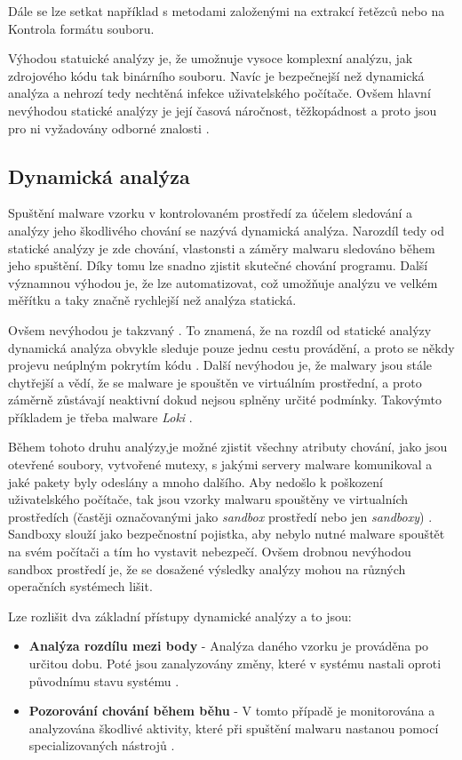 Dále se lze setkat například s metodami založenými na extrakcí řetězců nebo na Kontrola formátu souboru.

Výhodou statuické analýzy je, že umožnuje vysoce komplexní analýzu, jak zdrojového kódu tak binárního souboru. Navíc je bezpečnejší než dynamická analýza a nehrozí tedy nechtěná infekce uživatelského počítače.
Ovšem hlavní nevýhodou statické analýzy je její časová náročnost, těžkopádnost a proto jsou pro ni vyžadovány odborné znalosti \cite{article_analysis_goat}.

\newpage
\subsection*{Dynamická analýza} \label{dynamic}
Spuštění malware vzorku v kontrolovaném prostředí za účelem sledování a analýzy jeho škodlivého chování se nazývá dynamická analýza.
Narozdíl tedy od statické analýzy je zde chování, vlastonsti a záměry malwaru sledováno během jeho spuštění.
Díky tomu lze snadno zjistit skutečné chování programu. Další významnou výhodou je, že lze automatizovat, což umožňuje analýzu ve velkém měřítku a taky značně rychlejší než analýza statická.

Ovšem nevýhodou je takzvaný . To znamená, že na rozdíl od statické analýzy dynamická analýza obvykle sleduje pouze jednu cestu provádění, a proto se někdy projevu
neúplným pokrytím kódu \cite{article_analysis_goat}. Další nevýhodou je, že malwary jsou stále chytřejší a vědí, že se malware je spouštěn ve virtuálním prostřední, a proto záměrně zůstávají neaktivní dokud nejsou splněny určité podmínky. Takovýmto příkladem je třeba malware \textit{Loki} \cite{malware_analysis}.

Během tohoto druhu analýzy,je možné zjistit všechny atributy chování, jako jsou otevřené soubory, vytvořené mutexy, s jakými servery malware komunikoval a jaké pakety byly odeslány a mnoho dalšího.
\label{sandbox}Aby nedošlo k poškození uživatelského počítače, tak jsou vzorky malwaru spouštěny ve virtualních prostředích (častěji označovanými jako \textit{sandbox} prostředí nebo jen \textit{sandboxy}) \cite{malware_analysis}. Sandboxy slouží jako bezpečnostní pojistka, aby
nebylo nutné malware spouštět na svém počítači a tím ho vystavit nebezpečí. Ovšem drobnou nevýhodou sandbox prostředí je, že se dosažené výsledky analýzy mohou na různých operačních systémech lišit.

Lze rozlišit dva základní přístupy dynamické analýzy a to jsou:
\begin{itemize}
    \item \textbf{Analýza rozdílu mezi body} - Analýza daného vzorku je prováděna po určitou dobu. Poté jsou zanalyzovány změny, které v systému nastali oproti původnímu stavu systému \cite{article_analysis_goat}.
    \item \textbf{Pozorování chování během běhu} - V tomto případě je monitorována a analyzována škodlivé aktivity, které při spuštění malwaru nastanou pomocí specializovaných nástrojů \cite{article_analysis_goat}. 
\end{itemize}

